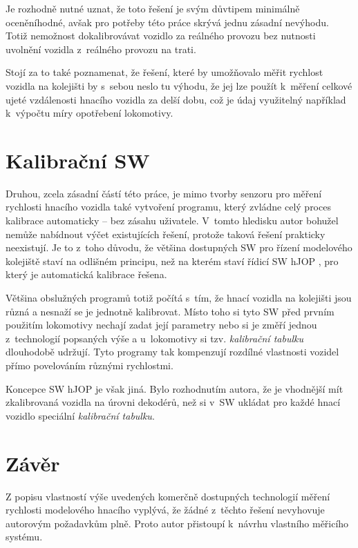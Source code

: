Je rozhodně nutné uznat, že toto řešení je svým důvtipem minimálně oceněníhodné,
avšak pro potřeby této práce skrývá jednu zásadní nevýhodu. Totiž nemožnost
dokalibrovávat vozidlo za reálného provozu bez nutnosti uvolnění vozidla
z~reálného provozu na trati.

Stojí za to také poznamenat, že řešení, které by umožňovalo měřit rychlost
vozidla na kolejišti by s~sebou neslo tu výhodu, že jej lze použít k~měření
celkové ujeté vzdálenosti hnacího vozidla za delší dobu, což je údaj využitelný
například k~výpočtu míry opotřebení lokomotivy.

\section{Kalibrační SW}
\label{sec:kalib-sw}

Druhou, zcela zásadní částí této práce, je mimo tvorby senzoru pro měření
rychlosti hnacího vozidla také vytvoření programu, který zvládne celý proces
kalibrace automaticky -- bez zásahu uživatele. V~tomto hledisku autor bohužel
nemůže nabídnout výčet existujících řešení, protože taková řešení
prakticky neexistují. Je to z~toho důvodu, že většina dostupných SW pro řízení
modelového kolejiště staví na odlišném principu, než na kterém staví řídicí SW
hJOP \cite{hjop:web}, pro který je automatická kalibrace řešena.

Většina obslužných programů totiž počítá s~tím, že hnací vozidla na kolejišti
jsou různá a nesnaží se je jednotně kalibrovat. Místo toho si tyto SW před
prvním použitím lokomotivy nechají zadat její parametry nebo si je změří jednou
z~technologií popsaných výše a u~lokomotivy si tzv. \textit{kalibrační tabulku}
dlouhodobě udržují. Tyto programy tak kompenzují rozdílné vlastnosti vozidel přímo
povelováním různými rychlostmi.

Koncepce SW hJOP je však jiná. Bylo rozhodnutím autora, že je vhodnější mít
zkalibrovaná vozidla na úrovni dekodérů, než si v~SW ukládat pro každé hnací
vozidlo speciální \textit{kalibrační tabulku}.

\section{Závěr}
\label{sec:prehled-zaver}

Z popisu vlastností výše uvedených komerčně dostupných technologií měření
rychlosti modelového hnacího vyplývá, že žádné z~těchto řešení nevyhovuje
autorovým požadavkům plně. Proto autor přistoupí k~návrhu vlastního měřicího
systému.
